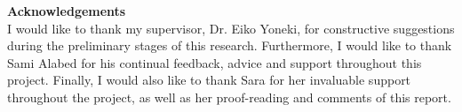 \newpage
{\Huge \bf Acknowledgements}\\

I would like to thank my supervisor, Dr. Eiko Yoneki, for constructive suggestions during the preliminary stages of this research. Furthermore, I would like to thank Sami Alabed for his continual feedback, advice and support throughout this project. Finally, I would also like to thank Sara for her invaluable support throughout the project, as well as her proof-reading and comments of this report.
